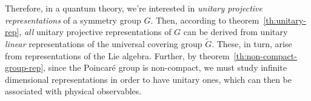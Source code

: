 Therefore, in a quantum theory, we're interested in \emph{unitary projective representations} of a symmetry group $G$. Then, according to theorem~\ref{th:unitary-rep}, \emph{all} unitary projective representations of $G$ can be derived from unitary \emph{linear} representations of the universal covering group $\tilde{G}$. These, in turn, arise from representations of the Lie algebra. Further, by theorem~\ref{th:non-compact-group-rep}, since the Poincaré group is non-compact, we must study infinite dimensional representations in order to have unitary ones, which can then be associated with physical observables.